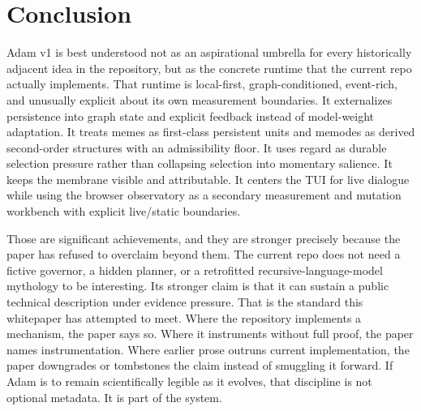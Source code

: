 \documentclass[10pt]{article}
\begin{document}
\section{Conclusion}

Adam v1 is best understood not as an aspirational umbrella for every historically adjacent idea in the repository, but as the concrete runtime that the current repo actually implements. That runtime is local-first, graph-conditioned, event-rich, and unusually explicit about its own measurement boundaries. It externalizes persistence into graph state and explicit feedback instead of model-weight adaptation. It treats memes as first-class persistent units and memodes as derived second-order structures with an admissibility floor. It uses regard as durable selection pressure rather than collapsing selection into momentary salience. It keeps the membrane visible and attributable. It centers the TUI for live dialogue while using the browser observatory as a secondary measurement and mutation workbench with explicit live/static boundaries.

Those are significant achievements, and they are stronger precisely because the paper has refused to overclaim beyond them. The current repo does not need a fictive governor, a hidden planner, or a retrofitted recursive-language-model mythology to be interesting. Its stronger claim is that it can sustain a public technical description under evidence pressure. That is the standard this whitepaper has attempted to meet. Where the repository implements a mechanism, the paper says so. Where it instruments without full proof, the paper names instrumentation. Where earlier prose outruns current implementation, the paper downgrades or tombstones the claim instead of smuggling it forward. If Adam is to remain scientifically legible as it evolves, that discipline is not optional metadata. It is part of the system.
\end{document}
